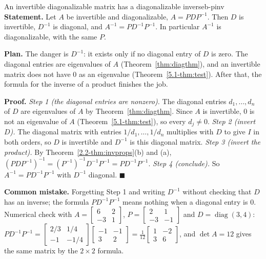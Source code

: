 \documentclass[11pt]{article}
\begin{document}
\begin{exmp}{An invertible diagonalizable matrix has a diagonalizable inverse}{b-pinv}
\textbf{Statement.} Let $A$ be invertible and diagonalizable, $A=PDP^{-1}$. Then $D$ is invertible, $D^{-1}$ is diagonal, and $A^{-1}=PD^{-1}P^{-1}$. In particular $A^{-1}$ is diagonalizable, with the same $P$.

\textbf{Plan.} The danger is $D^{-1}$: it exists only if no diagonal entry of $D$ is zero. The diagonal entries are eigenvalues of $A$ (Theorem~\ref{thm:diagthm}), and an invertible matrix does not have $0$ as an eigenvalue (Theorem~\ref{5.1-thm:test}). After that, the formula for the inverse of a product finishes the job.

\textbf{Proof.}
\emph{Step 1 (the diagonal entries are nonzero).} The diagonal entries $d_1,\dots,d_n$ of $D$ are eigenvalues of $A$ by Theorem~\ref{thm:diagthm}. Since $A$ is invertible, $0$ is not an eigenvalue of $A$ (Theorem~\ref{5.1-thm:test}), so every $d_j\neq0$.
\emph{Step 2 (invert $D$).} The diagonal matrix with entries $1/d_1,\dots,1/d_n$ multiplies with $D$ to give $I$ in both orders, so $D$ is invertible and $D^{-1}$ is this diagonal matrix.
\emph{Step 3 (invert the product).} By Theorem~\ref{2.2-thm:invprops}(b) and (a), $(PDP^{-1})^{-1}=(P^{-1})^{-1}D^{-1}P^{-1}=PD^{-1}P^{-1}$.
\emph{Step 4 (conclude).} So $A^{-1}=PD^{-1}P^{-1}$ with $D^{-1}$ diagonal. \qquad$\blacksquare$

\textbf{Common mistake.} Forgetting Step 1 and writing $D^{-1}$ without checking that $D$ has an inverse; the formula $PD^{-1}P^{-1}$ means nothing when a diagonal entry is $0$. Numerical check with $A=\begin{bmatrix}6&2\\-3&1\end{bmatrix}$, $P=\begin{bmatrix}2&1\\-3&-1\end{bmatrix}$ and $D=\operatorname{diag}(3,4)$: $PD^{-1}P^{-1}=\begin{bmatrix}2/3&1/4\\-1&-1/4\end{bmatrix}\begin{bmatrix}-1&-1\\3&2\end{bmatrix}=\tfrac1{12}\begin{bmatrix}1&-2\\3&6\end{bmatrix}$, and $\det A=12$ gives the same matrix by the $2\times2$ formula.
\end{exmp}
\end{document}
